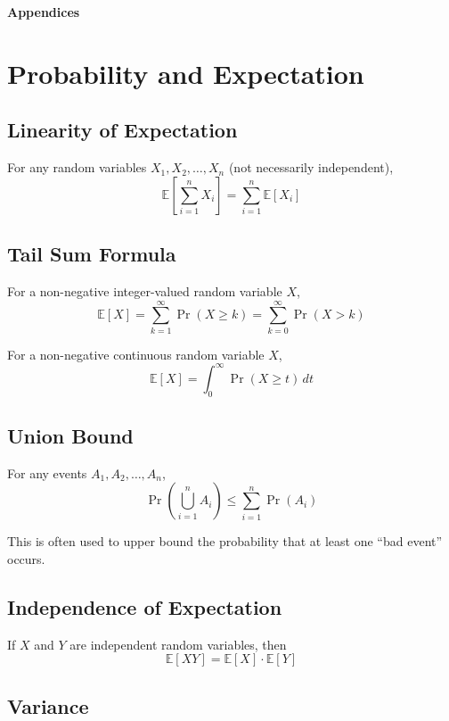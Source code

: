 \clearpage
\thispagestyle{empty}

\vspace*{\fill}
{}
\begin{center}
{\Huge\bfseries Appendices}
\end{center}
\vspace*{\fill}

\clearpage

\chapter{Probability and Expectation}

\section{Linearity of Expectation}
\label{linearity_of_expectation}
\noindent For any random variables $X_1,X_2,\dots,X_n$ (not necessarily independent),
\[
\mathbb{E}\left[\sum_{i=1}^n X_i\right]=\sum_{i=1}^n \mathbb{E}[X_i]
\]

\section{Tail Sum Formula}
\label{tail_sum}
For a non-negative integer-valued random variable \(X\),
\[
\mathbb{E}[X]
=
\sum_{k=1}^{\infty}\Pr(X\ge k)
=
\sum_{k=0}^{\infty}\Pr(X > k)
\]

\noindent For a non-negative continuous random variable \(X\),
\[
\mathbb{E}[X]
=
\int_0^\infty \Pr(X\ge t)\,dt
\]

\section{Union Bound}
\label{union_bound}
For any events $A_1,A_2,\dots,A_n$,
\[
\Pr\left(\bigcup_{i=1}^n A_i\right)\le \sum_{i=1}^n \Pr(A_i)
\]

\noindent This is often used to upper bound the probability that at least one ``bad event'' occurs.

\section{Independence of Expectation}
\label{independence_of_expectation}
If $X$ and $Y$ are independent random variables, then
\[
\mathbb{E}[XY]=\mathbb{E}[X]\cdot \mathbb{E}[Y]
\]

\section{Variance}

